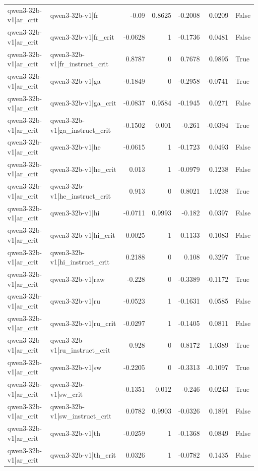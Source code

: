 \begin{table}
\begin{tabular}{l l r r r r l}
qwen3-32b-v1|ar_crit & qwen3-32b-v1|fr & -0.09 & 0.8625 & -0.2008 & 0.0209 & False \\
qwen3-32b-v1|ar_crit & qwen3-32b-v1|fr_crit & -0.0628 & 1 & -0.1736 & 0.0481 & False \\
qwen3-32b-v1|ar_crit & qwen3-32b-v1|fr_instruct_crit & 0.8787 & 0 & 0.7678 & 0.9895 & True \\
qwen3-32b-v1|ar_crit & qwen3-32b-v1|ga & -0.1849 & 0 & -0.2958 & -0.0741 & True \\
qwen3-32b-v1|ar_crit & qwen3-32b-v1|ga_crit & -0.0837 & 0.9584 & -0.1945 & 0.0271 & False \\
qwen3-32b-v1|ar_crit & qwen3-32b-v1|ga_instruct_crit & -0.1502 & 0.001 & -0.261 & -0.0394 & True \\
qwen3-32b-v1|ar_crit & qwen3-32b-v1|he & -0.0615 & 1 & -0.1723 & 0.0493 & False \\
qwen3-32b-v1|ar_crit & qwen3-32b-v1|he_crit & 0.013 & 1 & -0.0979 & 0.1238 & False \\
qwen3-32b-v1|ar_crit & qwen3-32b-v1|he_instruct_crit & 0.913 & 0 & 0.8021 & 1.0238 & True \\
qwen3-32b-v1|ar_crit & qwen3-32b-v1|hi & -0.0711 & 0.9993 & -0.182 & 0.0397 & False \\
qwen3-32b-v1|ar_crit & qwen3-32b-v1|hi_crit & -0.0025 & 1 & -0.1133 & 0.1083 & False \\
qwen3-32b-v1|ar_crit & qwen3-32b-v1|hi_instruct_crit & 0.2188 & 0 & 0.108 & 0.3297 & True \\
qwen3-32b-v1|ar_crit & qwen3-32b-v1|raw & -0.228 & 0 & -0.3389 & -0.1172 & True \\
qwen3-32b-v1|ar_crit & qwen3-32b-v1|ru & -0.0523 & 1 & -0.1631 & 0.0585 & False \\
qwen3-32b-v1|ar_crit & qwen3-32b-v1|ru_crit & -0.0297 & 1 & -0.1405 & 0.0811 & False \\
qwen3-32b-v1|ar_crit & qwen3-32b-v1|ru_instruct_crit & 0.928 & 0 & 0.8172 & 1.0389 & True \\
qwen3-32b-v1|ar_crit & qwen3-32b-v1|sw & -0.2205 & 0 & -0.3313 & -0.1097 & True \\
qwen3-32b-v1|ar_crit & qwen3-32b-v1|sw_crit & -0.1351 & 0.012 & -0.246 & -0.0243 & True \\
qwen3-32b-v1|ar_crit & qwen3-32b-v1|sw_instruct_crit & 0.0782 & 0.9903 & -0.0326 & 0.1891 & False \\
qwen3-32b-v1|ar_crit & qwen3-32b-v1|th & -0.0259 & 1 & -0.1368 & 0.0849 & False \\
qwen3-32b-v1|ar_crit & qwen3-32b-v1|th_crit & 0.0326 & 1 & -0.0782 & 0.1435 & False \\

\end{tabular}
\end{table}
